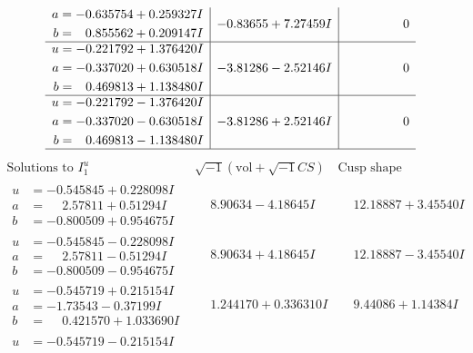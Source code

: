 \documentclass[1p]{elsarticle_modified}
\theoremstyle{definition}
\newcommand{\I}{\sqrt{-1}}
\begin{document}
$$\begin{array}{c|c|c}
\begin{aligned}
a &= -0.635754 + 0.259327 I \\
b &= \phantom{-}0.855562 + 0.209147 I\end{aligned}
 & -0.83655 + 7.27459 I & \phantom{-0.000000 } 0 \\ \hline\begin{aligned}
u &= -0.221792 + 1.376420 I \\
a &= -0.337020 + 0.630518 I \\
b &= \phantom{-}0.469813 + 1.138480 I\end{aligned}
 & -3.81286 - 2.52146 I & \phantom{-0.000000 } 0 \\ \hline\begin{aligned}
u &= -0.221792 - 1.376420 I \\
a &= -0.337020 - 0.630518 I \\
b &= \phantom{-}0.469813 - 1.138480 I\end{aligned}
 & -3.81286 + 2.52146 I & \phantom{-0.000000 } 0\\
 \hline 
 \end{array}$$\newpage$$\begin{array}{c|c|c}  
\text{Solutions to }I^u_{1}& \I (\text{vol} + \sqrt{-1}CS) & \text{Cusp shape}\\
 \hline 
\begin{aligned}
u &= -0.545845 + 0.228098 I \\
a &= \phantom{-}2.57811 + 0.51294 I \\
b &= -0.800509 + 0.954675 I\end{aligned}
 & \phantom{-}8.90634 - 4.18645 I & \phantom{-}12.18887 + 3.45540 I \\ \hline\begin{aligned}
u &= -0.545845 - 0.228098 I \\
a &= \phantom{-}2.57811 - 0.51294 I \\
b &= -0.800509 - 0.954675 I\end{aligned}
 & \phantom{-}8.90634 + 4.18645 I & \phantom{-}12.18887 - 3.45540 I \\ \hline\begin{aligned}
u &= -0.545719 + 0.215154 I \\
a &= -1.73543 - 0.37199 I \\
b &= \phantom{-}0.421570 + 1.033690 I\end{aligned}
 & \phantom{-}1.244170 + 0.336310 I & \phantom{-}9.44086 + 1.14384 I \\ \hline\begin{aligned}
u &= -0.545719 - 0.215154 I \\

\end{aligned}
\end{array}$$
\end{document}

